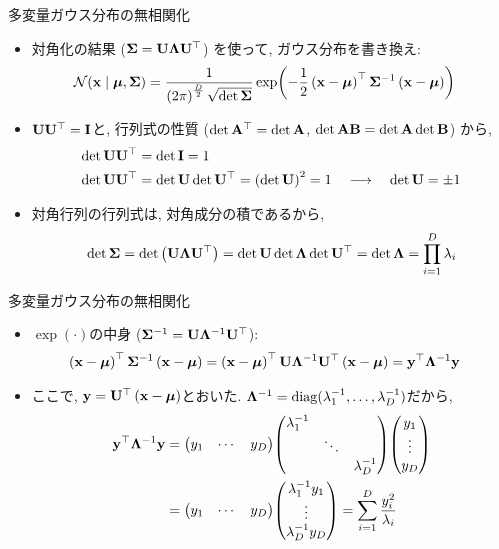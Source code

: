 \documentclass[dvipdfmx,notheorems,t]{beamer}
\begin{document}
\begin{frame}{多変量ガウス分布の無相関化}
\begin{itemize}
  \item 対角化の結果 ($\vb{\Sigma} = \vb{U} \vb{\Lambda} \vb{U}^\top$) を使って, ガウス分布を書き換え:
  \begin{align*}
    \mathcal{N}(\vb{x} \mid \vb*{\mu}, \vb{\Sigma})
      &= \frac{1}{\left( 2\pi \right)^\frac{D}{2} \sqrt{\det \vb{\Sigma}}}
        \exp(-\frac{1}{2} \left( \vb{x} - \vb*{\mu} \right)^\top \vb{\Sigma}^{-1}
        \left( \vb{x} - \vb*{\mu} \right))
  \end{align*}
  \item $\vb{U} \vb{U}^\top = \vb{I}$と, 行列式の性質
  ($\det \vb{A}^\top = \det \vb{A}$, $\det \vb{A} \vb{B} = \det \vb{A} \det \vb{B}$) から,
  \begin{align*}
    \det \vb{U} \vb{U}^\top &= \det \vb{I} = 1 \\
    \det \vb{U} \vb{U}^\top &= \det \vb{U} \det \vb{U}^\top = \left( \det \vb{U} \right)^2 = 1
    \quad \longrightarrow \quad
    \det \vb{U} = \pm 1
  \end{align*}
  \item 対角行列の行列式は, 対角成分の積であるから,
  \begin{align*}
    \det \vb{\Sigma} = \det \left( \vb{U} \vb{\Lambda} \vb{U}^\top \right)
      = \det \vb{U} \det \vb{\Lambda} \det \vb{U}^\top
      = \det \vb{\Lambda} = \prod_{i = 1}^D \lambda_i
  \end{align*}
\end{itemize}
\end{frame}

\begin{frame}{多変量ガウス分布の無相関化}
\begin{itemize}
  \item $\exp(\cdot)$の中身 ($\vb{\Sigma}^{-1} = \vb{U} \vb{\Lambda}^{-1} \vb{U}^\top$):
  \begin{align*}
    \left( \vb{x} - \vb*{\mu} \right)^\top \vb{\Sigma}^{-1}
      \left( \vb{x} - \vb*{\mu} \right)
    &= \left( \vb{x} - \vb*{\mu} \right)^\top
      \vb{U} \vb{\Lambda}^{-1} \vb{U}^\top
      \left( \vb{x} - \vb*{\mu} \right)
    = \vb{y}^\top \vb{\Lambda}^{-1} \vb{y}
  \end{align*}
  \item ここで, $\vb{y} = \vb{U}^\top \left( \vb{x} - \vb*{\mu} \right)$とおいた.
  $\vb{\Lambda}^{-1} = \operatorname{diag}(\lambda_1^{-1}, \ldots, \lambda_D^{-1})$だから,
  \begin{align*}
    \vb{y}^\top \vb{\Lambda}^{-1} \vb{y}
    &= \mqty(y_1 & \cdots & y_D) \mqty(\dmat{\lambda_1^{-1}, \ddots, \lambda_D^{-1}})
      \mqty(y_1 \\ \vdots \\ y_D) \\
    &= \mqty(y_1 & \cdots & y_D) \mqty(\lambda_1^{-1} y_1 \\ \vdots \\ \lambda_D^{-1} y_D)
    = \sum_{i = 1}^D \frac{y_i^2}{\lambda_i}
  \end{align*}
\end{itemize}
\end{frame}
\end{document}
